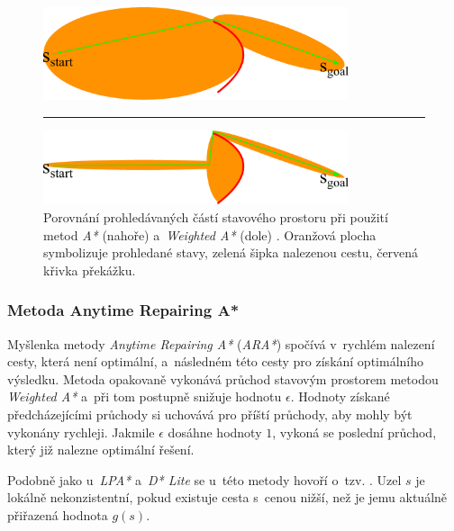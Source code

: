 \begin{figure}[ht]
    \begin{center}
        \includegraphics[width=0.8\textwidth]{doc/obrazky-figures/astar-search-space.pdf}
        \medskip
        \rule{0.8\textwidth}{0.4pt}
        \medskip
        \includegraphics[width=0.8\textwidth]{doc/obrazky-figures/weighted-astar-search-space.pdf}
    \end{center}
    \caption{Porovnání prohledávaných částí stavového prostoru při použití metod \emph{A*} (nahoře) a~\emph{Weighted A*} (dole) \cite{Likachev_astar_weighted_astar}. Oranžová plocha symbolizuje prohledané stavy, zelená šipka nalezenou cestu, červená křivka překážku.}
    \label{fig:astar-wighted-astar-search-space}
\end{figure}

\subsubsection*{Metoda Anytime Repairing A*}

Myšlenka metody \emph{Anytime Repairing A*} (\emph{ARA*}) \cite{ARA_star} spočívá v~rychlém nalezení cesty, která není optimální, a~následném  této cesty pro získání optimálního výsledku. Metoda opakovaně vykonává průchod stavovým prostorem metodou \emph{Weighted A*} a~při tom postupně snižuje hodnotu $\epsilon$. Hodnoty získané předcházejícími průchody si uchovává pro příští průchody, aby mohly být vykonány rychleji. Jakmile $\epsilon$ dosáhne hodnoty $1$, vykoná se poslední průchod, který již nalezne optimální řešení.

Podobně jako u~\emph{LPA*} a~\emph{D* Lite} se u~této metody hovoří o~tzv. . Uzel $s$ je lokálně nekonzistentní, pokud existuje cesta s~cenou nižší, než je jemu aktuálně přiřazená hodnota $g(s)$.

